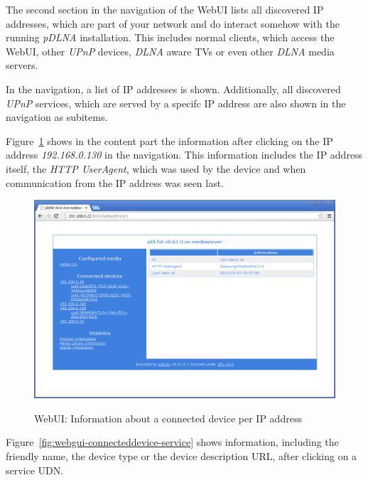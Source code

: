 \documentclass[a4paper,oneside,10pt]{report}
\begin{document}
The second section in the navigation of the WebUI lists all discovered IP addresses, which are part of your network and do interact somehow with the running {\em pDLNA} installation. This includes normal clients, which access the WebUI, other {\em UPnP} devices, {\em DLNA} aware TVs or even other {\em DLNA} media servers.

In the navigation, a list of IP addresses is shown. Additionally, all discovered {\em UPnP} services, which are served by a specifc IP address are also shown in the navigation as subitems.

Figure~\ref{fig:webgui-connecteddevice-ip} shows in the content part the information after clicking on the IP address {\em 192.168.0.130} in the navigation. This information includes the IP address itself, the {\em HTTP UserAgent}, which was used by the device and when communication from the IP address was seen last.

\begin{figure}
	\centering
		\includegraphics[width=34em]{images/webui_device_ip}
	\label{fig:webgui-connecteddevice-ip}
	\caption{WebUI: Information about a connected device per IP address}
\end{figure}

Figure~\ref{fig:webgui-connecteddevice-service} shows information, including the friendly name, the device type or the device description URL, after clicking on a service UDN.
\end{document}
